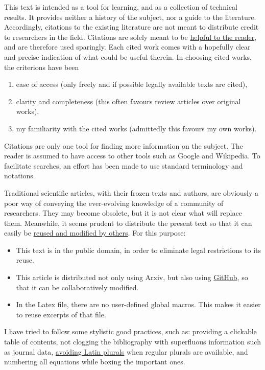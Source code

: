 \documentclass[12pt, a4paper, notitlepage, twoside]{report}
\numberwithin{equation}{section}
\theoremstyle{break}
\begin{document}
This text is intended as a tool for learning, and as a collection of technical results.
It provides neither a history of the subject, nor a guide to the literature.
Accordingly, citations to the existing literature are not meant to distribute credit to researchers in the field.
Citations are solely meant to be 
\href{http://researchpracticesandtools.blogspot.fr/2013/08/write-for-humans-not-for-robots.html}
{helpful to the reader}, and are therefore used sparingly.
Each cited work comes with a hopefully clear and precise indication of what could be useful therein.
In choosing cited works, the criterions have been
\begin{enumerate}
\item ease of access (only freely and if possible legally available texts are cited), 
\item clarity and completeness (this often favours review articles over original works),
\item my familiarity with the cited works (admittedly this favours my own works). 
\end{enumerate}
Citations are only one tool for finding more information on the subject. 
The reader is assumed to have access to other tools such as Google and Wikipedia. 
To facilitate searches, an effort has been made to use standard terminology and notations. 

Traditional scientific articles, with their frozen texts and authors, are obviously a poor way of conveying the ever-evolving knowledge of a community of researchers.
They may become obsolete, but it is not clear what will replace them.
Meanwhile, it seems prudent to distribute the present text so that it can easily be 
\href{http://researchpracticesandtools.blogspot.fr/2014/02/the-case-for-emancipating-articles-from.html}
{reused and modified by others}.
For this purpose:
\begin{itemize}
 \item This text is in the public domain, in order to eliminate legal restrictions to its reuse. 
\item This article is distributed not only using Arxiv, but also using \href{https://github.com/ribault/CFT-Review}{GitHub}, so that it can be collaboratively modified. 
\item In the Latex file, there are no user-defined global macros.
This makes it easier to reuse excerpts of that file. 
\end{itemize}

I have tried to follow some stylistic good practices, such as: providing a clickable table of contents, not clogging the bibliography with superfluous information such as journal data, \href{http://researchpracticesandtools.blogspot.fr/2018/01/will-no-one-rid-me-of-these-tiresome.html}{avoiding Latin plurals} when regular plurals are available, and numbering all equations while boxing the important ones. 
\end{document}
